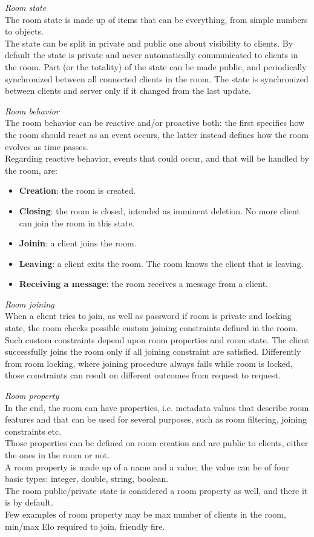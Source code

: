 \bigskip
\textit{Room state}
\\
The room state is made up of items that can be everything, from simple numbers to objects.   
\\
The state can be split in private and public one about visibility to clients. By default the state is private and never automatically communicated to clients in the room. Part (or the totality) of the state can be made public, and periodically synchronized between all connected clients in the room. The state is synchronized between clients and server only if it changed from the last update. 

\bigskip
\textit{Room behavior}
\\
The room behavior can be reactive and/or proactive both: the first specifies how the room should react as an event occurs, the latter instead defines how the room evolves as time passes.
\\
Regarding reactive behavior, events that could occur, and that will be handled by the room, are:
\begin{itemize}
\item \textbf{Creation}: the room is created.
\item \textbf{Closing}: the room is closed, intended as imminent deletion. No more client can join the room in this state. 
\item \textbf{Joinin}: a client joins the room.
\item \textbf{Leaving}: a client exits the room. The room knows the client that is leaving.
\item \textbf{Receiving a message}: the room receives a message from a client.
\end{itemize} 

\bigskip
\textit{Room joining}
\\
When a client tries to join, as well as password if room is private and locking state, the room checks possible custom joining constraints defined in the room. Such custom constraints depend upon room properties and room state. The client successfully joins the room only if all joining constraint are satisfied. Differently from room locking, where joining procedure always fails while room is locked, those constraints can result on different outcomes from request to request. 

\bigskip
\textit{Room property}
\\  
In the end, the room can have properties, i.e. metadata values that describe room features and that can be used for several purposes, such as room filtering, joining constraints etc.
\\
Those properties can be defined on room creation and are public to clients, either the ones in the room or not.
\\
A room property is made up of a name and a value; the value can be of four basic types: integer, double, string, boolean. 
\\
The room public/private state is considered a room property as well, and there it is by default.
\\
Few examples of room property may be max number of clients in the room, min/max Elo required to join, friendly fire.

